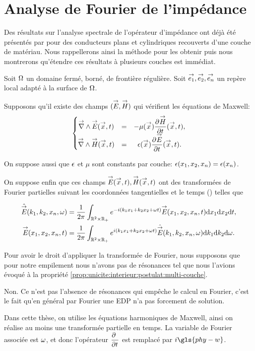 \section{Analyse de Fourier de l'impédance}

Des résultats sur l'analyse spectrale de l'opérateur d'impédance ont déjà été présentés par \cite{hoppe_impedance_1995} pour des conducteurs plans et cylindriques recouverts d'une couche de matériau.
Nous rappellerons ainsi la méthode pour les obtenir puis nous montrerons qu’étendre ces résultats à plusieurs couches est immédiat. 

Soit \(\OO\) un domaine fermé, borné, de frontière régulière. Soit \(\vect{e_1},\vect{e_2},\vect{e_n}\) un repère local adapté à la surface de \(\OO\).

Supposons qu'il existe des champs \((\vE,\vect H)\) qui vérifient les équations de Maxwell:
\begin{equation*}
    \left\lbrace
    \begin{matrix}
    \vrot \vE(\vect{x},t) &=& -\mu(\vx) \ddr{t}{\vect H}(\vx,t),
    \\
    \vrot \vect H(\vect{x},t) &=& \eps(\vx) \ddr{t}{\vE}(\vx,t).
    \end{matrix}
    \right.
\end{equation*}

On suppose aussi que \(\eps\) et \(\mu\) sont constants par couche: \(\eps(x_1,x_2,x_n)=\eps(x_n)\).

On suppose enfin que ces champs \(\vE(\vect{x},t),\vect H(\vect{x},t)\) ont des transformées de Fourier partielles suivant les coordonnées tangentielles et le temps
(\cite[Théorème de Plancherel, p.~153]{yosida_functional_1995}) telles que

\begin{align*}
    \hat{\vE} (k_1,k_2,x_n,\w) &= \frac{1}{2\pi}\int_{\RR^2\times\RR_+} e^{-i(k_1x_1+k_2x_2+\w t)}\vE(x_1,x_2,x_n,t) \dd{x_1}\dd{x_2}\dd{t},
    \\
    \vE(x_1,x_2,x_n,t) &= \frac{1}{2\pi}\int_{\RR^2\times\RR_+} e^{i(k_1x_1+k_2x_2+\w t)}\hat{\vE} (k_1,k_2,x_n,\w) \dd{k_1}\dd{k_2} \dd{\w}.
\end{align*}

Pour avoir le droit d'appliquer la transformée de Fourier, nous supposons que pour notre empilement nous n'avons pas de résonances tel que nous l'avions évoqué à la propriété \eqref{prop:unicite:interieur:postulat:multi-couche}. 
\begin{REM}
    Non. Ce n'est pas l'absence de résonances qui empêche le calcul en Fourier, c'est le fait qu'en général par Fourier une EDP n'a pas forcement de solution.
\end{REM}
Dans cette thèse, on utilise les équations harmoniques de Maxwell, ainsi on réalise au moins une transformée partielle en temps. La variable de Fourier associée est \(\w\), et donc l'opérateur \(\ddr{t}{~}\) est remplacé par \(i\gls{phy-w}\).

